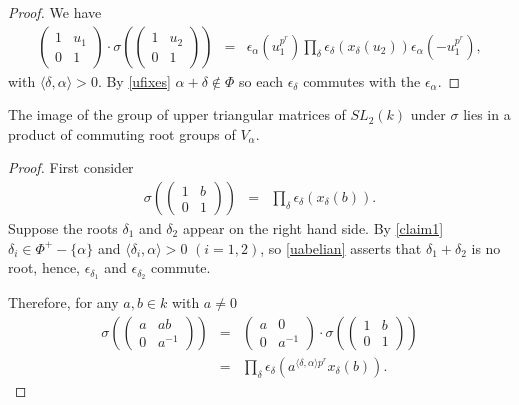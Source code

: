 \begin{proof}
We have
\begin{eqnarray*}
\left(\begin{matrix}1 & u_1 \\ 0 & 1 \end{matrix}\right)
\cdot
\sigma\left(\left(\begin{matrix} 1 & u_2 \\ 0 & 1\end{matrix}\right)\right)
&=&
\epsilon_\alpha\left(u_1^{p^r}\right) \prod_\delta \epsilon_\delta\left(x_\delta\left(u_2\right)\right) \epsilon_\alpha\left(-u_1^{p^r}\right),
\end{eqnarray*}
with $\langle \delta, \alpha \rangle > 0$. By \ref{ufixes} $\alpha + \delta \notin \Phi$ so each $\epsilon_\delta$ commutes with the $\epsilon_\alpha$.
\end{proof}

\begin{corollary} The image of the group of upper triangular matrices of $SL_2(k)$ under $\sigma$ lies in a product of commuting root groups of $V_\alpha$.
\end{corollary}
\begin{proof}
First consider
\begin{eqnarray*}
\sigma\left(\left( \begin{matrix} 1 & b \\ 0 & 1 \end{matrix}\right)\right) &=& \prod_\delta \epsilon_\delta\left(x_\delta(b)\right).
\end{eqnarray*}
Suppose the roots $\delta_1$ and $\delta_2$ appear on the right hand side. By \ref{claim1} $\delta_i \in \Phi^+ - \{\alpha\}$ and $\langle \delta_i, \alpha \rangle > 0$ $(i=1,2)$, so \ref{uabelian} asserts that $\delta_1 + \delta_2$ is no root, hence, $\epsilon_{\delta_1}$ and $\epsilon_{\delta_2}$ commute. 

Therefore, for any $a, b\in k$ with $a\neq 0$
\begin{eqnarray*}
\sigma\left(\left(\begin{matrix} a & ab \\ 0 & a^{-1}\end{matrix}\right)\right) 
&=& \left(\begin{matrix} a & 0 \\ 0 & a^{-1}\end{matrix} \right) \cdot
\sigma\left(\left(\begin{matrix} 1 & b \\ 0 & 1\end{matrix}\right)\right) \\
&=& \prod_\delta \epsilon_\delta\left(a^{\langle \delta, \alpha \rangle p^r}x_\delta\left(b\right)\right).
\end{eqnarray*}
\end{proof}

